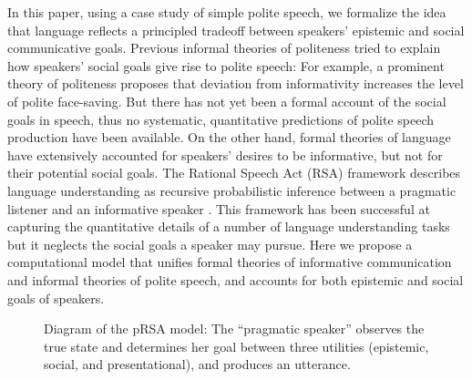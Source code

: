 \documentclass[12pt]{article}
\begin{document}
In this paper, using a case study of simple polite speech, 
we formalize the idea that language reflects a principled tradeoff between speakers' epistemic and social communicative goals.
Previous informal theories of politeness tried to explain how speakers' social goals give rise to polite speech: 
For example, a prominent theory of politeness \cite{brown1987} proposes that
deviation from informativity increases the level of polite face-saving.
But there has not yet been a formal account of the social goals in speech, 
thus no systematic, quantitative predictions of polite speech production have been available.
On the other hand, formal theories of language have extensively accounted for speakers' desires to be informative, 
but not for their potential social goals. 
The Rational Speech Act (RSA) framework describes language understanding 
as recursive probabilistic inference between a pragmatic listener and an informative speaker \cite{goodman2016}. 
This framework has been successful at capturing the quantitative details of a number of language understanding tasks 
but it neglects the social goals a speaker may pursue. 
Here we propose a computational model that unifies formal theories of informative communication and informal theories of polite speech, and accounts for both epistemic and social goals of speakers.

\begin{figure}
\centering
\caption{\label{fig:model}Diagram of the pRSA model: The \enquote{pragmatic speaker} observes the true state and determines her goal between three utilities (epistemic, social, and presentational), and produces an utterance. 
}
\end{figure}
\end{document}
